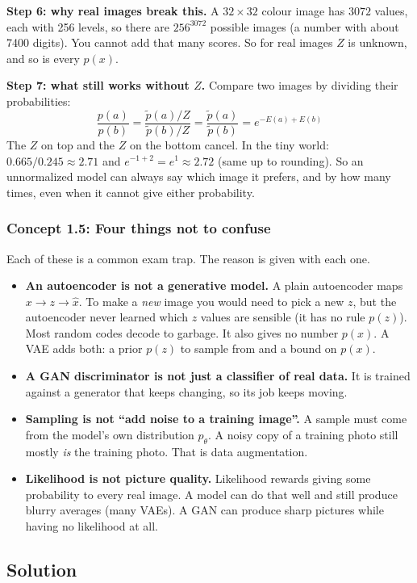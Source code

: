 \documentclass[12pt,a4paper]{article}
\begin{document}
\textbf{Step 6: why real images break this.} A $32\times32$ colour image has $3072$ values, each with 256 levels, so there are $256^{3072}$ possible images (a number with about 7400 digits). You cannot add that many scores. So for real images $Z$ is unknown, and so is every $p(x)$.

\textbf{Step 7: what still works without $Z$.} Compare two images by dividing their probabilities:
\[
\frac{p(a)}{p(b)}=\frac{\tilde p(a)/Z}{\tilde p(b)/Z}=\frac{\tilde p(a)}{\tilde p(b)}=e^{-E(a)+E(b)}
\]
The $Z$ on top and the $Z$ on the bottom cancel. In the tiny world: $0.665/0.245\approx2.71$ and $e^{-1+2}=e^{1}\approx2.72$ (same up to rounding). So an unnormalized model can always say which image it prefers, and by how many times, even when it cannot give either probability.

\subsubsection{Concept 1.5: Four things not to confuse}\label{c1-5}

Each of these is a common exam trap. The reason is given with each one.
\begin{itemize}[nosep]
  \item \textbf{An autoencoder is not a generative model.} A plain autoencoder maps $x\to z\to\hat x$. To make a \emph{new} image you would need to pick a new $z$, but the autoencoder never learned which $z$ values are sensible (it has no rule $p(z)$). Most random codes decode to garbage. It also gives no number $p(x)$. A VAE adds both: a prior $p(z)$ to sample from and a bound on $p(x)$.
  \item \textbf{A GAN discriminator is not just a classifier of real data.} It is trained against a generator that keeps changing, so its job keeps moving.
  \item \textbf{Sampling is not ``add noise to a training image''.} A sample must come from the model's own distribution $p_\theta$. A noisy copy of a training photo still mostly \emph{is} the training photo. That is data augmentation.
  \item \textbf{Likelihood is not picture quality.} Likelihood rewards giving some probability to every real image. A model can do that well and still produce blurry averages (many VAEs). A GAN can produce sharp pictures while having no likelihood at all.
\end{itemize}

\subsection{Solution}
\end{document}
